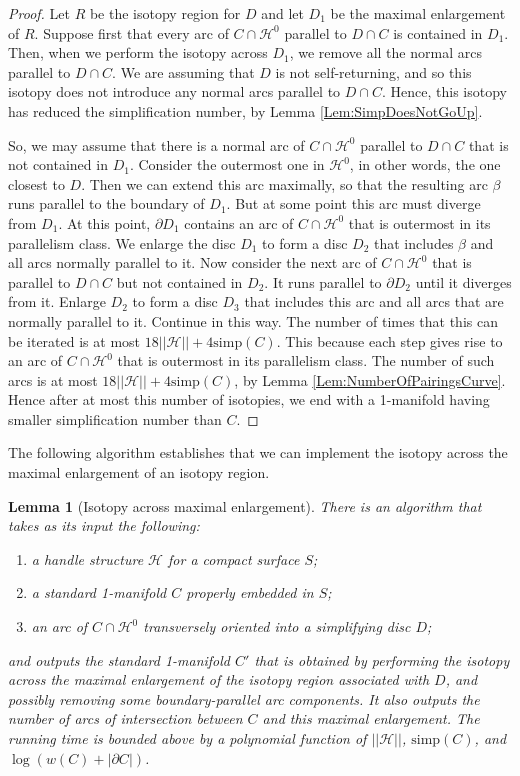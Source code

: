 \documentclass[oneside]{amsart}
\numberwithin{equation}{section}
\theoremstyle{plain}
\newtheorem{lemma}[equation]{Lemma}
\theoremstyle{definition}
\newcommand{\calH}{\mathcal{H}}
\begin{document}
\begin{proof}
Let $R$ be the isotopy region for $D$ and let $D_1$ be the maximal enlargement of $R$. Suppose first that every arc of $C \cap \calH^0$ parallel to $D \cap C$ is contained in $D_1$. Then, when we perform the isotopy across $D_1$, we remove all the normal arcs parallel to $D \cap C$. We are assuming that $D$ is not self-returning, and so this isotopy does not introduce any normal arcs parallel to $D \cap C$. Hence, this isotopy has reduced the simplification number, by Lemma \ref{Lem:SimpDoesNotGoUp}.

So, we may assume that there is a normal arc of $C \cap \calH^0$ parallel to $D \cap C$ that is not contained in $D_1$. Consider the outermost one in $\calH^0$, in other words, the one closest to $D$. Then we can extend this arc maximally, so that the resulting arc $\beta$ runs parallel to the boundary of $D_1$. But at some point this arc must diverge from $D_1$. At this point, $\partial D_1$ contains an arc of $C \cap \calH^0$ that is outermost in its parallelism class.
We enlarge the disc $D_1$ to form a disc $D_2$ that includes $\beta$ and all arcs normally parallel to it. Now consider the next arc of $C \cap \calH^0$ that is parallel to $D \cap C$ but not contained in $D_2$. It runs parallel to $\partial D_2$ until it diverges from it. Enlarge $D_2$ to form a disc $D_3$ that includes this arc and all arcs that are normally parallel to it. Continue in this way. The number of times that this can be iterated is at most $18||\calH|| + 4\mathrm{simp}(C)$. This because each step gives rise to an arc of $C \cap \calH^0$ that is outermost in its parallelism class. The number of such arcs is at most 
$18||\calH|| + 4\mathrm{simp}(C)$, by Lemma \ref{Lem:NumberOfPairingsCurve}. Hence after at most this number of isotopies, we end with a 1-manifold having smaller simplification number than $C$.
\end{proof}

The following algorithm establishes that we can implement the isotopy across the maximal enlargement of an isotopy region.

\begin{lemma}[{\sc Isotopy across maximal enlargement}]
\label{Lem:IsotopyAcrossMaximalEnlargement}
There is an algorithm that takes as its input the following:
\begin{enumerate}
\item a handle structure $\calH$ for a compact surface $S$;
\item a standard 1-manifold $C$ properly embedded in $S$;
\item an arc of $C \cap \calH^0$ transversely oriented into a simplifying disc $D$;
\end{enumerate}
and outputs the standard 1-manifold $C'$ that is obtained by performing the isotopy across the maximal enlargement of the isotopy region associated with $D$,
and possibly removing some boundary-parallel arc components. It also outputs the number of arcs of intersection between $C$ and this maximal enlargement.
The running time is bounded above by a polynomial function of $||\calH||$, $\mathrm{simp}(C)$, and $\log (w(C) + |\partial C|)$.
\end{lemma}
\end{document}
